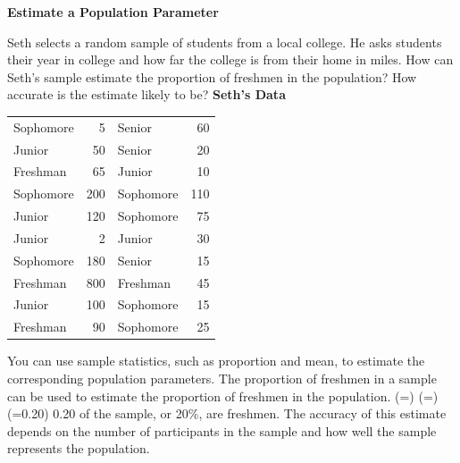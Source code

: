 \documentclass{article}
\newenvironment{example}[1]{}{}         %
\newcommand{\answer}[1]{}               %
\newcommand{\te}[1]{}                   %
\begin{document}
\begin{example}{1}
\textbf{Estimate a Population Parameter}
\te{APPLICATION}
Seth selects a random sample of students from a local college. He asks students their year in college and how far the college is from their home in miles. How can Seth's sample estimate the proportion of freshmen in the population? How accurate is the estimate likely to be?
\textbf{Seth's Data}
\begin{tabular}{lrlr}
Sophomore & 5 & Senior & 60 \\
Junior & 50 & Senior & 20 \\
Freshman & 65 & Junior & 10 \\
Sophomore & 200 & Sophomore & 110 \\
Junior & 120 & Sophomore & 75 \\
Junior & 2 & Junior & 30 \\
Sophomore & 180 & Senior & 15 \\
Freshman & 800 & Freshman & 45 \\
Junior & 100 & Sophomore & 15 \\
Freshman & 90 & Sophomore & 25 \\
\end{tabular}
You can use sample statistics, such as proportion and mean, to estimate the corresponding population parameters. The proportion of freshmen in a sample can be used to estimate the proportion of freshmen in the population.
(=)
(=)
(=0.20)
0.20 of the sample, or 20\%, are freshmen.
The accuracy of this estimate depends on the number of participants in the sample and how well the sample represents the population.
\te{COMMUNICATE PRECISELY Different samples include different individuals with different characteristics. Results should be reported clearly, explaining how measures were obtained.}
\te{Callout: If by chance the sample clusters away from the true mean, estimates will not be very accurate.}
\te{Callout: Larger samples usually provide more accurate estimates than smaller samples.}
\answer{20\%; accuracy depends on the number of participants and how well the sample represents the population.}
\end{example}
\end{document}
